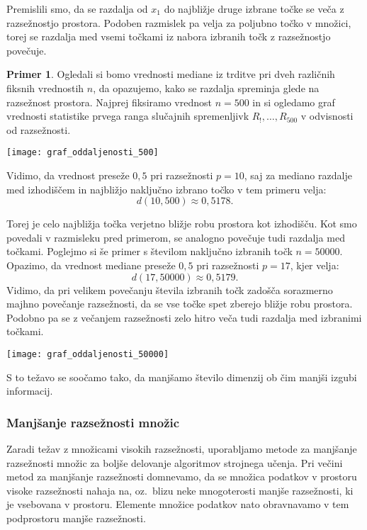 \documentclass[12pt,a4paper,twoside]{article}
\theoremstyle{definition} %
\newtheorem{primer}[definicija]{Primer}
\theoremstyle{plain} %
\numberwithin{equation}{section}  %
\begin{document}
Premislili smo, da se razdalja od $x_1$ do najbližje druge izbrane točke se veča z razsežnostjo prostora. 
Podoben razmislek pa velja za poljubno točko v množici, torej se razdalja med vsemi točkami iz nabora izbranih točk z razsežnostjo povečuje.

\begin{primer}
Ogledali si bomo vrednosti mediane iz trditve pri dveh različnih fiksnih vrednostih $n$, da opazujemo, kako se razdalja spreminja glede na razsežnost prostora. 
Najprej fiksiramo vrednost $n=500$ in si ogledamo graf vrednosti statistike prvega ranga slučajnih spremenljivk $R_!,\ldots,R_{500}$ v odvisnosti od razsežnosti.

\begin{center}
\texttt{[image: graf\_oddaljenosti\_500]}
\end{center}

Vidimo, da vrednost preseže $0,5$ pri razsežnosti $p=10$, saj za mediano razdalje med izhodiščem in najbližjo naključno izbrano točko v tem primeru velja:
\[
d(10,500) \approx 0,5178.
\]

Torej je celo najbližja točka verjetno bližje robu prostora kot izhodišču. 
Kot smo povedali v razmisleku pred primerom, se analogno povečuje tudi razdalja med točkami. 
Poglejmo si še primer s številom naključno izbranih točk $n=50000$. Opazimo, da vrednost mediane preseže $0,5$ pri razsežnosti $p=17$, kjer velja:
\[
d(17,50000) \approx 0,5179.
\]
Vidimo, da pri velikem povečanju števila izbranih točk zadošča sorazmerno majhno povečanje razsežnosti, da se vse točke spet zberejo bližje robu prostora. 
Podobno pa se z večanjem razsežnosti zelo hitro veča tudi razdalja med izbranimi točkami.

\begin{center}
\texttt{[image: graf\_oddaljenosti\_50000]}
\end{center}

\end{primer}

S to težavo se soočamo tako, da manjšamo število dimenzij ob čim manjši izgubi informacij.


\subsubsection{Manjšanje razsežnosti množic}

Zaradi težav z množicami visokih razsežnosti, uporabljamo metode za manjšanje razsežnosti množic za boljše delovanje algoritmov strojnega učenja. 
Pri večini metod za manjšanje razsežnosti domnevamo, da se množica podatkov v prostoru visoke razsežnosti nahaja na, 
oz.~blizu neke mnogoterosti manjše razsežnosti, ki je vsebovana v prostoru. %
Elemente množice podatkov nato obravnavamo v tem podprostoru manjše razsežnosti.
\end{document}
